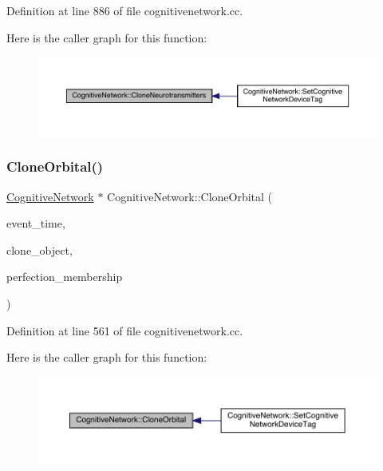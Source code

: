 Definition at line 886 of file cognitivenetwork.\+cc.

Here is the caller graph for this function\+:
\nopagebreak
\begin{figure}[H]
\begin{center}
\leavevmode
\includegraphics[width=350pt]{class_cognitive_network_a2b2d40d179f95ff96e9aa0559234cc31_icgraph}
\end{center}
\end{figure}
\mbox{\label{class_cognitive_network_aa8992740f25d46b0be3d9d8344c39f67}} 
\subsubsection{\texorpdfstring{Clone\+Orbital()}{CloneOrbital()}}
{\footnotesize\ttfamily \hyperlink{class_cognitive_network}{Cognitive\+Network} $\ast$ Cognitive\+Network\+::\+Clone\+Orbital (\begin{DoxyParamCaption}\item[{std\+::chrono\+::time\+\_\+point$<$ \hyperlink{universe_8h_a0ef8d951d1ca5ab3cfaf7ab4c7a6fd80}{Clock} $>$}]{event\+\_\+time,  }\item[{\hyperlink{class_cognitive_network}{Cognitive\+Network} $\ast$}]{clone\+\_\+object,  }\item[{double}]{perfection\+\_\+membership }\end{DoxyParamCaption})}



Definition at line 561 of file cognitivenetwork.\+cc.

Here is the caller graph for this function\+:
\nopagebreak
\begin{figure}[H]
\begin{center}
\leavevmode
\includegraphics[width=350pt]{class_cognitive_network_aa8992740f25d46b0be3d9d8344c39f67_icgraph}
\end{center}
\end{figure}
\mbox{\label{class_cognitive_network_a266b7baf2fd9d6b5c5652e251830020a}} 
